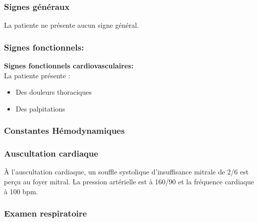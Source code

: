 \documentclass[12pt,a4paper]{article}%
\begin{document}
%
\subsubsection*{Signes généraux}%
\label{ssubsec:Signesgnraux}%

%
La patiente ne présente aucun signe général.%
\subsubsection*{Signes fonctionnels:}%
\label{ssubsec:Signesfonctionnels}%

%
\textbf{Signes fonctionnels cardiovasculaires:}%
\\%
La patiente présente :%
\begin{itemize}%
\setlength{\itemsep}{0pt}%
\item%
Des douleurs thoraciques%
\item%
Des palpitations%
\end{itemize}%
\subsubsection*{Constantes Hémodynamiques}%
\label{ssubsec:ConstantesHmodynamiques}%

%


\begin{table}[h!]%
\centering%
%
\end{table}

%
\subsubsection*{Auscultation cardiaque}%
\label{ssubsec:Auscultationcardiaque}%

%
À l'auscultation cardiaque, un souffle systolique d'insuffisance mitrale de 2/6 est perçu au foyer mitral. La pression artérielle est à 160/90 et la fréquence cardiaque à 100 bpm.%
\subsubsection*{Examen respiratoire}%
\label{ssubsec:Examenrespiratoire}%
\end{document}
